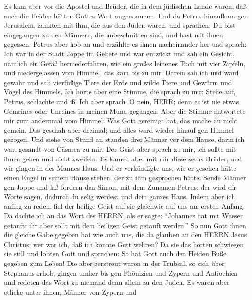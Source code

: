  Es kam aber vor die Apostel und Brüder, die in dem
jüdischen Lande waren, daß auch die Heiden hätten Gottes Wort
angenommen.  Und da Petrus hinaufkam gen Jerusalem, zankten
mit ihm, die aus den Juden waren,  und sprachen: Du bist
eingegangen zu den Männern, die unbeschnitten sind, und hast mit ihnen
gegessen.  Petrus aber hob an und erzählte es ihnen
nacheinander her und sprach:  Ich war in der Stadt Joppe im
Gebete und war entzückt und sah ein Gesicht, nämlich ein Gefäß
herniederfahren, wie ein großes leinenes Tuch mit vier Zipfeln, und
niedergelassen vom Himmel, das kam bis zu mir.  Darein sah
ich und ward gewahr und sah vierfüßige Tiere der Erde und wilde Tiere
und Gewürm und Vögel des Himmels.  Ich hörte aber eine
Stimme, die sprach zu mir: Stehe auf, Petrus, schlachte und iß!
 Ich aber sprach: O nein, HERR; denn es ist nie etwas
Gemeines oder Unreines in meinen Mund gegangen.  Aber die
Stimme antwortete mir zum andernmal vom Himmel: Was Gott gereinigt hat,
das mache du nicht gemein.  Das geschah aber dreimal; und
alles ward wieder hinauf gen Himmel gezogen.  Und siehe von
Stund an standen drei Männer vor dem Hause, darin ich war, gesandt von
Cäsarea zu mir.  Der Geist aber sprach zu mir, ich sollte
mit ihnen gehen und nicht zweifeln. Es kamen aber mit mir diese sechs
Brüder, und wir gingen in des Mannes Haus.  Und er
verkündigte uns, wie er gesehen hätte einen Engel in seinem Hause
stehen, der zu ihm gesprochen hätte: Sende Männer gen Joppe und laß
fordern den Simon, mit dem Zunamen Petrus;  der wird dir
Worte sagen, dadurch du selig werdest und dein ganzes Haus.
 Indem aber ich anfing zu reden, fiel der heilige Geist auf
sie gleichwie auf uns am ersten Anfang.  Da dachte ich an
das Wort des HERRN, als er sagte: ``Johannes hat mit Wasser getauft; ihr
aber sollt mit dem heiligen Geist getauft werden.''  So nun
Gott ihnen die gleiche Gabe gegeben hat wie auch uns, die da glauben an
den HERRN Jesus Christus: wer war ich, daß ich konnte Gott wehren?
 Da sie das hörten schwiegen sie still und lobten Gott und
sprachen: So hat Gott auch den Heiden Buße gegeben zum Leben!
 Die aber zerstreut waren in der Trübsal, so sich über
Stephanus erhob, gingen umher bis gen Phönizien und Zypern und
Antiochien und redeten das Wort zu niemand denn allein zu den Juden.
 Es waren aber etliche unter ihnen, Männer von Zypern und
